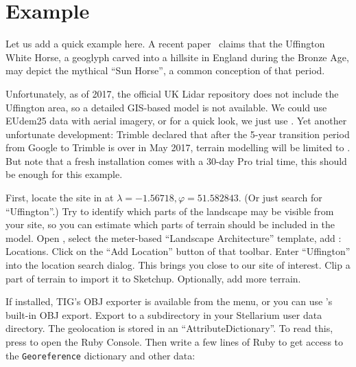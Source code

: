 \section{Example}
\label{sec:scenery3d:example}
Let us add a quick example here. A recent paper~\citep{Pollard:2017:UffingtonHorse} claims that the Uffington White Horse, 
a geoglyph carved into a hillsite in England during the Bronze Age,  may depict the mythical ``Sun Horse'', a common conception of that period.

Unfortunately, as of 2017, the official UK Lidar repository does not include the Uffington area, 
so a detailed GIS-based model is not available. We could use EUdem25 data with aerial imagery, 
or for a quick look, we just use .
Yet another unfortunate development: Trimble declared that after the 5-year transition 
period from Google to Trimble is over in May 2017, terrain modelling will be limited to . 
But note that a fresh installation comes with a 30-day Pro trial time, this should be enough for this example.

First, locate the site in  at $\lambda=-1.56718, \varphi=51.582843$. (Or just search for ``Uffington''.)
Try to identify which parts of the landscape may be visible from your site, so you can estimate which parts of terrain should be included in the model.
Open , select the meter-based ``Landscape Architecture'' template, add : Locations. 
Click on the ``Add Location'' button of that toolbar. Enter ``Uffington'' into the location search dialog. 
This brings you close to our site of interest. Clip a part of terrain to import it to Sketchup. Optionally, add more terrain. 

If installed, TIG's OBJ exporter is available from the  menu, or you can use 's built-in OBJ export. 
Export  to a subdirectory   in your Stellarium user data directory.
The geolocation is stored in an ``AttributeDictionary''. To read this, press  to open the Ruby Console. 
Then write a few lines of Ruby to get access to the \texttt{Georeference} dictionary and other data:
						

